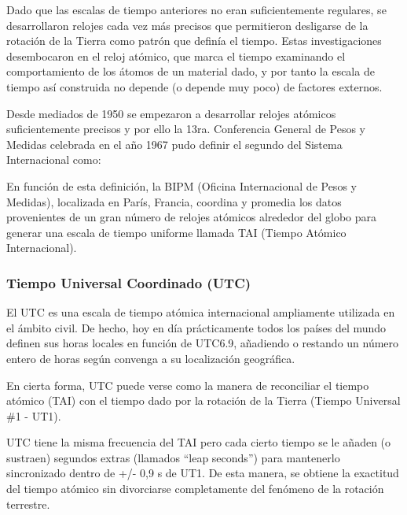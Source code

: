 Dado que las escalas de tiempo anteriores no eran suficientemente regulares, se desarrollaron relojes cada vez más precisos que permitieron desligarse de la rotación de la Tierra como patrón que definía el tiempo. Estas investigaciones desembocaron en el reloj atómico, que marca el tiempo examinando el comportamiento de los átomos de un material dado, y por tanto la escala de tiempo así construida no depende (o depende muy poco) de factores externos.

Desde mediados de 1950 se empezaron a desarrollar relojes atómicos suficientemente precisos y por ello la 13ra. Conferencia General de Pesos y Medidas celebrada en el año 1967 pudo definir el segundo del Sistema Internacional como:

\vspace{3mm}


\vspace{3mm}

En función de esta definición, la BIPM (Oficina Internacional de Pesos y Medidas), localizada en París, Francia, coordina y promedia los datos provenientes de un gran número de relojes atómicos alrededor del globo para generar una escala de tiempo uniforme llamada TAI (Tiempo Atómico Internacional). 



\subsubsection{Tiempo Universal Coordinado (UTC)}
\label{sec:tiempo.universal.coordinado}
 El UTC es una escala de tiempo atómica internacional ampliamente utilizada en el ámbito civil. De hecho, hoy en día prácticamente todos los países del mundo definen sus horas locales en función de UTC6.9, añadiendo o restando un número entero de horas según convenga a su localización geográfica.

En cierta forma, UTC puede verse como la manera de reconciliar el tiempo atómico (TAI) con el tiempo dado por la rotación de la Tierra (Tiempo Universal \#1 - UT1).

UTC tiene la misma frecuencia del TAI pero cada cierto tiempo se le añaden (o sustraen) segundos extras (llamados ``leap seconds'') para mantenerlo sincronizado dentro de +/- 0,9 s de UT1. De esta manera, se obtiene la exactitud del tiempo atómico sin divorciarse completamente del fenómeno de la rotación terrestre.

